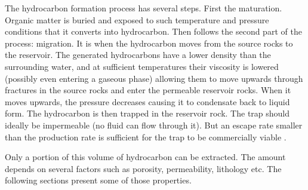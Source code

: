 The hydrocarbon formation process has several steps. First the maturation. Organic matter is buried and exposed to such temperature and pressure conditions that it converts into hydrocarbon. Then follows the second part of the process: migration. It is when the hydrocarbon moves from the source rocks to the reservoir. The generated hydrocarbons have a lower density than the surrounding water, and at sufficient temperatures their viscosity is lowered (possibly even entering a gaseous phase) allowing them to move upwards through fractures in the source rocks and enter the permeable reservoir rocks. When it moves upwards, the pressure decreases causing it to condensate back to liquid form. The hydrocarbon is then trapped in the reservoir rock. The trap should ideally be impermeable (no fluid can flow through it). But an escape rate smaller than the production rate is sufficient for the trap to be commercially viable \cite{oilbegin}. 

Only a portion of this volume of hydrocarbon can be extracted. The amount depends on several factors such as porosity, permeability, lithology etc.  The following sections present some of those properties. 
